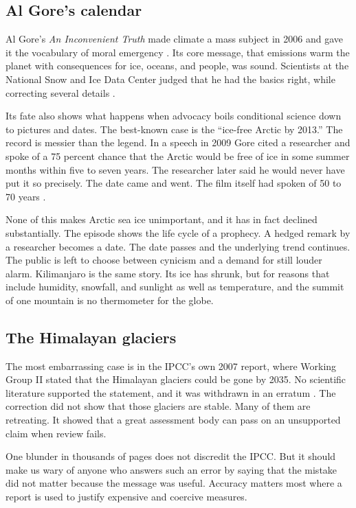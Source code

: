 \documentclass[12pt,a4paper]{book}
\begin{document}
\subsection{Al Gore's calendar}

Al Gore's \emph{An Inconvenient Truth} made climate a mass subject in 2006 and gave it the vocabulary of moral emergency \cite{Gore2006}. Its core message, that emissions warm the planet with consequences for ice, oceans, and people, was sound. Scientists at the National Snow and Ice Data Center judged that he had the basics right, while correcting several details \cite{NSIDC2006Gore}.

Its fate also shows what happens when advocacy boils conditional science down to pictures and dates. The best-known case is the ``ice-free Arctic by 2013.'' The record is messier than the legend. In a speech in 2009 Gore cited a researcher and spoke of a 75 percent chance that the Arctic would be free of ice in some summer months within five to seven years. The researcher later said he would never have put it so precisely. The date came and went. The film itself had spoken of 50 to 70 years \cite{Putterman2021}.

None of this makes Arctic sea ice unimportant, and it has in fact declined substantially. The episode shows the life cycle of a prophecy. A hedged remark by a researcher becomes a date. The date passes and the underlying trend continues. The public is left to choose between cynicism and a demand for still louder alarm. Kilimanjaro is the same story. Its ice has shrunk, but for reasons that include humidity, snowfall, and sunlight as well as temperature, and the summit of one mountain is no thermometer for the globe.

\subsection{The Himalayan glaciers}

The most embarrassing case is in the IPCC's own 2007 report, where Working Group II stated that the Himalayan glaciers could be gone by 2035. No scientific literature supported the statement, and it was withdrawn in an erratum \cite{IPCC2007Errata}. The correction did not show that those glaciers are stable. Many of them are retreating. It showed that a great assessment body can pass on an unsupported claim when review fails.

One blunder in thousands of pages does not discredit the IPCC. But it should make us wary of anyone who answers such an error by saying that the mistake did not matter because the message was useful. Accuracy matters most where a report is used to justify expensive and coercive measures.
\end{document}

